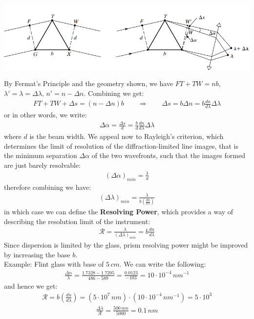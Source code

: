\documentclass[11pt]{book}
\theoremstyle{break}
\theoremstyle{break}
\newcommand{\ee}[1]{\cdot 10^{#1}}
\newcommand{\example}{\color{green}Example: \color{black}}
\begin{document}
\begin{center}
\includegraphics[scale=0.65]{resolvingPower.png}
\end{center}
By Fermat's Principle and the geometry shown, we have $FT+TW = nb$, $\lambda' = \lambda = \Delta \lambda$, $n' = n - \Delta n$. Combining we get:
\begin{align*}
FT + TW + \Delta s = (n-\Delta n)b \qquad \Rightarrow \qquad \Delta s = b \Delta n = b \frac{dn}{d\lambda}\Delta \lambda
\end{align*}
or in other words, we write:
\begin{align*}
\Delta \alpha = \frac{\Delta s}{d} = \frac{b}{d}\frac{dn}{d\lambda}\Delta \lambda
\end{align*}
where $d$ is the beam width. We appeal now to Rayleigh's criterion, which determines the limit of resolution of the diffraction-limited line images, that is the minimum separation $\Delta\alpha$ of the two wavefronts, such that the images formed are just barely resolvable:
\begin{align*}
(\Delta \alpha)_{min} = \frac{\lambda}{d}
\end{align*}
therefore combining we have:
\begin{align*}
(\Delta\lambda)_{min} = \frac{\lambda}{b\left( \frac{dn}{d\lambda}\right)}
\end{align*}
in which case we can define the \textbf{Resolving Power}, which provides a way of describing the resolution limit of the instrument:
\begin{align*}
\mathcal{R} = \frac{\lambda}{(\Delta \lambda)_{min}} =b \frac{dn}{d\lambda}
\end{align*}
Since dispersion is limited by the glass,
prism resolving power might be improved by increasing the base $b$.\\

\example Flint glass with base of $5\, cm$. We can write the following:
\begin{align*}
\frac{\Delta n}{\lambda} = \frac{1.7328 - 1.7205}{486-589} = \frac{0.0123}{-103} = 10\ee{-4}\, nm^{-1}
\end{align*}
and hence we get:
\begin{align*}
\mathcal{R} = b \left(\frac{dn}{d\lambda} \right) =( 5\ee{7}\, nm)\cdot (10\ee{-4}\, nm^{-1}) = 5\ee{3}
\end{align*}
\begin{align*}
\frac{\Delta \lambda}{\mathcal{R}} = \frac{500\, nm}{5000} = 0.1\, nm
\end{align*}
\end{document}
